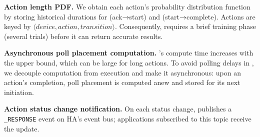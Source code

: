 \noindent \textbf{Action length PDF.}
We obtain each action's probability distribution function by storing historical durations for (ack→start) and (start→complete). 
Actions are keyed by \(\langle\textit{device},\allowbreak\textit{action},\allowbreak\textit{transition}\rangle\). 
Consequently, \dynpoller{} requires a brief training phase (several trials) before it can return accurate results.

\noindent \textbf{Asynchronous poll placement computation.}
's compute time increases with the upper bound, which can be large for long actions. 
To avoid polling delays
in \sysname, we decouple computation from execution and make it asynchronous: upon an action's completion, poll placement is computed anew and stored for its next initiation. 

\noindent \textbf{Action status change notification.}
On each status change, \sysname{} publishes a \texttt{\abs\_\allowbreak RESPONSE} event on HA's event bus; applications subscribed to this topic receive the update.
